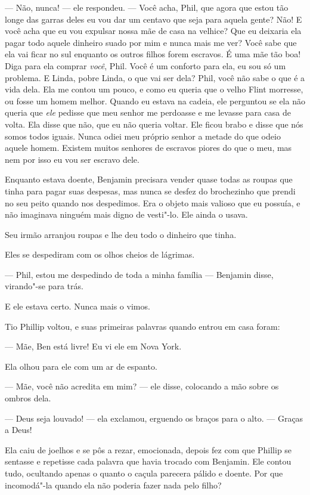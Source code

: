 --- Não, nunca! --- ele respondeu. ---
Você acha, Phil, que agora que estou tão longe das garras deles eu vou
dar um centavo que seja para aquela gente? Não! E você acha que eu vou
expulsar nossa mãe de casa na velhice? Que eu deixaria ela pagar todo
aquele dinheiro suado por mim e nunca mais me ver? Você sabe que ela vai
ficar no sul enquanto os outros filhos forem escravos. É uma mãe tão
boa! Diga para ela comprar \emph{você}, Phil. Você é um conforto para
ela, eu sou só um problema. E Linda, pobre Linda, o que vai ser dela?
Phil, você não sabe o que é a vida dela. Ela me contou um pouco, e como
eu queria que o velho Flint morresse, ou fosse um homem melhor. Quando
eu estava na cadeia, ele perguntou se ela não queria que \emph{ele}
pedisse que meu senhor me perdoasse e me levasse para casa de volta. Ela
disse que não, que eu não queria voltar. Ele ficou brabo e disse que nós
somos todos iguais. Nunca odiei meu próprio senhor a metade do que odeio
aquele homem. Existem muitos senhores de escravos piores do que o meu,
mas nem por isso eu vou ser escravo dele.

Enquanto estava doente, Benjamin
precisara vender quase todas as roupas que tinha para pagar suas
despesas, mas nunca se desfez do brochezinho que prendi no seu peito
quando nos despedimos. Era o objeto mais valioso que eu possuía, e não
imaginava ninguém mais digno de vesti"-lo. Ele ainda o usava.

Seu irmão arranjou roupas e lhe deu
todo o dinheiro que tinha.

Eles se despediram com os olhos cheios
de lágrimas.

--- Phil, estou me despedindo de toda a minha família --- Benjamin
disse, virando"-se para trás.

E ele estava certo. Nunca mais o vimos.

Tio Phillip voltou, e suas primeiras
palavras quando entrou em casa foram:

--- Mãe, Ben está livre! Eu vi ele em Nova York.

Ela olhou para ele com um ar de espanto.

--- Mãe, você não acredita em mim? --- ele disse, colocando a mão sobre
os ombros dela.

--- Deus seja louvado! --- ela exclamou, erguendo os braços para o alto.
--- Graças a Deus!

Ela caiu de joelhos e se pôs a rezar, emocionada, depois fez com que
Phillip se sentasse e repetisse cada palavra que havia trocado com
Benjamin. Ele contou tudo, ocultando apenas o quanto o caçula parecera
pálido e doente. Por que incomodá"-la quando ela não poderia fazer nada
pelo filho?

